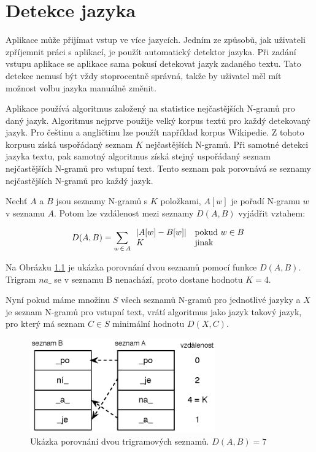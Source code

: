 \chapter{Detekce jazyka}

Aplikace může přijímat vstup ve více jazycích. Jedním ze způsobů, jak uživateli zpříjemnit práci s aplikací, je použít automatický detektor jazyka. Při zadání vstupu aplikace se aplikace sama pokusí detekovat jazyk zadaného textu. Tato detekce nemusí být vždy stoprocentně správná, takže by uživatel měl mít možnost volbu jazyka manuálně změnit.

Aplikace používá algoritmus založený na statistice nejčastějších N-gramů pro daný jazyk\cite{cavnar}. Algoritmus nejprve použije velký korpus textů pro každý detekovaný jazyk. Pro češtinu a angličtinu lze použít například korpus Wikipedie. Z tohoto korpusu získá uspořádaný seznam $K$ nejčastějších N-gramů. Při samotné detekci jazyka textu, pak samotný algoritmus získá stejný uspořádaný seznam nejčastějších N-gramů pro vstupní text. Tento seznam pak porovnává se seznamy nejčastějších N-gramů pro každý jazyk.

Nechť $A$ a $B$ jsou seznamy N-gramů s $K$ položkami, $A[w]$ je pořadí N-gramu $w$ v seznamu $A$. Potom lze vzdálenost mezi seznamy $D(A,B)$ vyjádřit vztahem:

\begin{equation}
  D(A, B) = \sum_{w\,\in\,A} \begin{array}{l l} |A[w] - B[w]| & \mathrm{pokud}\ w \in B \\
  K & \mathrm{jinak} \end{array}
\end{equation}

Na Obrázku \ref{fig:detekce_jazyka} je ukázka porovnání dvou seznamů pomocí funkce $D(A,B)$. Trigram $na\_$ se v seznamu B nenachází, proto dostane hodnotu $K = 4$.

Nyní pokud máme množinu $S$ všech seznamů N-gramů pro jednotlivé jazyky a $X$ je seznam N-gramů pro vstupní text, vrátí algoritmus jako jazyk takový jazyk, pro který má seznam $C \in S$ minimální hodnotu $D(X, C)$.


\begin{figure}[h]
  \centering
  \includegraphics[width=80mm]{detekce_jazyka.eps}
  \caption{Ukázka porovnání dvou trigramových seznamů. $D(A, B) = 7$}
  \label{fig:detekce_jazyka}
\end{figure}


